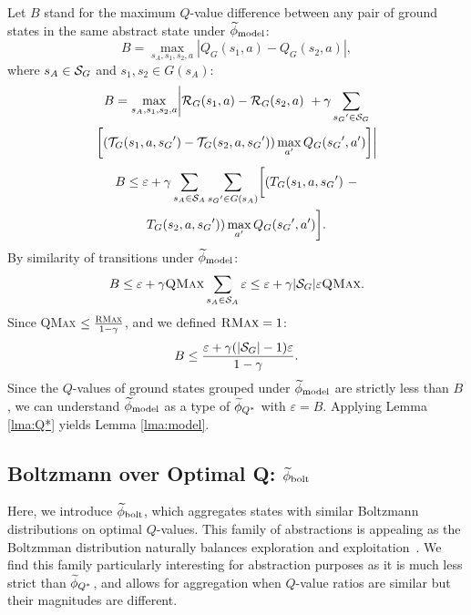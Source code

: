 Let $B$ stand for the maximum $Q$-value difference between any pair of ground states in the same abstract state under $\widetilde \phi_{\text{model}}$:
\begin{equation*}
B = \max_{s_A, s_1, s_2, a}  |Q_G(s_1, a) - Q_G(s_2, a)|,
\end{equation*}
where $s_A \in \mathcal{S}_G$ and $s_1, s_2 \in G(s_A)$:
\begin{multline*}
B=\max_{s_A, s_1, s_2, a}      \biggl|\mathcal{R}_G(s_1, a) - \mathcal{R}_G(s_2, a)\ + \gamma \sum_{{s_G}' \in \mathcal{S}_G} \\
\biggl[(\mathcal{T}_G(s_1,a,{s_G}') -\mathcal{T}_G(s_2, a, {s_G}'))\max_{a'}Q_G({s_G}', a')\biggr]\biggr|
\end{multline*}
\begin{multline*}
B\leq \varepsilon + \gamma \sum_{s_A \in \mathcal{S}_A}\sum_{{s_G}' \in G(s_A)} \biggl[(T_G(s_1, a, {s_G}')\ -\\ 
T_G(s_2, a, {s_G}')) \max_{a'}Q_G({s_G}', a') \biggr].
\end{multline*}
By similarity of transitions under $\widetilde \phi_{\text{model}}$:
\begin{align*}
B \leq \varepsilon + \gamma \textsc{QMax} \sum_{s_A \in \mathcal{S}_A} \varepsilon \leq \varepsilon + \gamma|\mathcal{S}_G|\varepsilon \textsc{QMax}.
\end{align*}
Since \textsc{QMax} $\leq \frac{\textsc{RMax}}{1-\gamma}$, and we defined $\textsc{RMax} = 1$:
\begin{equation*}
B \leq \frac{\varepsilon + \gamma(|\mathcal{S}_G| - 1) \varepsilon}{1-\gamma}.
\end{equation*}
Since the $Q$-values of ground states grouped under $\widetilde \phi_{\text{model}}$ are strictly less than $B$, we can understand $\widetilde \phi_{\text{model}}$ as a type of $\widetilde \phi_{Q^*}$ with $\varepsilon = B$. Applying Lemma \ref{lma:Q*} yields Lemma \ref{lma:model}.
\subsection{Boltzmann over Optimal Q: $\widetilde \phi_{\text{bolt}}$}
\label{sec:boltz}

Here, we introduce $\widetilde \phi_{\text{bolt}}$, which aggregates states with similar Boltzmann distributions on optimal $Q$-values. This family of abstractions is appealing as the Boltzmman distribution naturally balances exploration and exploitation~\cite{sutton1998reinforcement}. We find this family particularly interesting for abstraction purposes as it is much less strict than $\widetilde \phi_{Q^*}$, and allows for aggregation when $Q$-value ratios are similar but their magnitudes are different.

